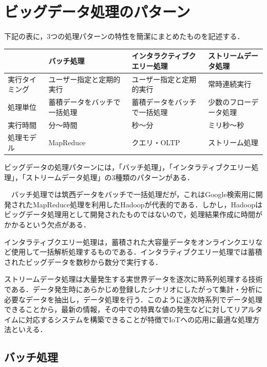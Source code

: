 \section{ビッグデータ処理のパターン}

下記の表に，3つの処理パターンの特性を簡潔にまとめたものを記述する．

\begin{table}[H]
  \begin{tabular}{|l|l|l|l|} \hline
                     & バッチ処理 & インタラクティブクエリー処理 & ストリームデータ処理 \\ \hline
    実行タイミング & ユーザー指定と定期的実行 & ユーザー指定と定期的実行 & 常時連続実行 \\ \hline
    処理単位 & 蓄積データをバッチで一括処理 & 蓄積データをバッチで一括処理 & 少数のフローデータ処理 \\ \hline
    実行時間 & 分～時間 & 秒～分 & ミリ秒～秒 \\ \hline
    処理モデル & MapReduce & クエリ・OLTP & ストリーム処理 \\ \hline
  \end{tabular}
\end{table}


ビッグデータの処理パターンには，「バッチ処理」，「インタラティブクエリー処理」，「ストリームデータ処理」の3種類のパターンがある．

　バッチ処理では筑西データをバッチで一括処理だが，これはGoogle検索用に開発されたMapReduce処理を利用したHadoopが代表的である．しかし，Hadoopはビッグデータ処理用として開発されたものではないので，処理結果作成に時間がかかるという欠点がある．

インタラティブクエリー処理は，蓄積された大容量データをオンラインクエリなど使用して一括解析処理するものである．インタラティブクエリー処理では蓄積されたビッグデータを数秒から数分で実行する．

ストリームデータ処理は大量発生する実世界データを逐次に時系列処理する技術である．データ発生時にあらかじめ登録したシナリオにしたがって集計・分析に必要なデータを抽出し，データ処理を行う．このように逐次時系列でデータ処理できることから，最新の情報，その中での特異な値の発生などに対してリアルタイムに対応するシステムを構築できることが特徴でIoTへの応用に最適な処理方法といえる．\cite{bigquerystart}


\subsection{バッチ処理}

